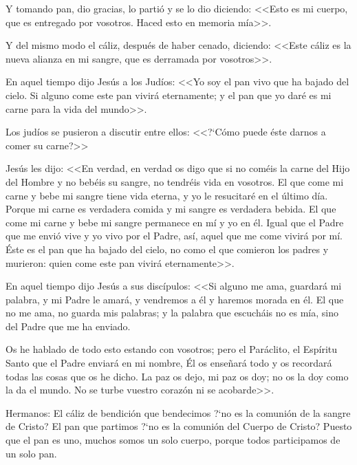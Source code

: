 Y tomando pan, dio gracias, lo partió y 
se lo dio diciendo: <<Esto es mi cuerpo, que es 
entregado por vosotros. Haced esto en 
memoria mía>>. 

Y del mismo modo el cáliz, 
después de haber cenado, diciendo: <<Este cáliz 
es la nueva alianza en mi sangre, que es 
derramada por vosotros>>. 


 En aquel tiempo dijo Jesús a los Judíos: <<Yo 
soy el pan vivo que ha bajado del cielo. Si 
alguno come este pan vivirá eternamente; y el 
pan que yo daré es mi carne para la vida del 
mundo>>. 

Los judíos se pusieron a discutir 
entre ellos: <<?`Cómo puede éste darnos a comer 
su carne?>> 

Jesús les dijo: <<En verdad, en 
verdad os digo que si no coméis la carne del 
Hijo del Hombre y no bebéis su sangre, no 
tendréis vida en vosotros. El que come mi 
carne y bebe mi sangre tiene vida eterna, y yo 
le resucitaré en el último día. Porque mi carne 
es verdadera comida y mi sangre es verdadera 
bebida. El que come mi carne y bebe mi sangre 
permanece en mí y yo en él. Igual que el Padre 
que me envió vive y yo vivo por el Padre, así, 
aquel que me come vivirá por mí. Éste es el 
pan que ha bajado del cielo, no como el que 
comieron los padres y murieron: quien come 
este pan vivirá eternamente>>. 


 En aquel tiempo dijo Jesús a sus discípulos: 
<<Si alguno me ama, guardará mi palabra, y mi 
Padre le amará, y vendremos a él y haremos 
morada en él. El que no me ama, no guarda 
mis palabras; y la palabra que escucháis no es 
mía, sino del Padre que me ha enviado. 

Os he 
hablado de todo esto estando con vosotros; 
pero el Paráclito, el Espíritu Santo que el Padre 
enviará en mi nombre, Él os enseñará todo y 
os recordará todas las cosas que os he dicho. 
La paz os dejo, mi paz os doy; no os la doy
como la da el mundo. No se turbe vuestro 
corazón ni se acobarde>>. 


 Hermanos: 
El cáliz de bendición que bendecimos ?`no es la comunión de la sangre 
de Cristo? El pan que partimos ?`no es la 
comunión del Cuerpo de Cristo? Puesto que el 
pan es uno, muchos somos un solo cuerpo, 
porque todos participamos de un solo pan. 

